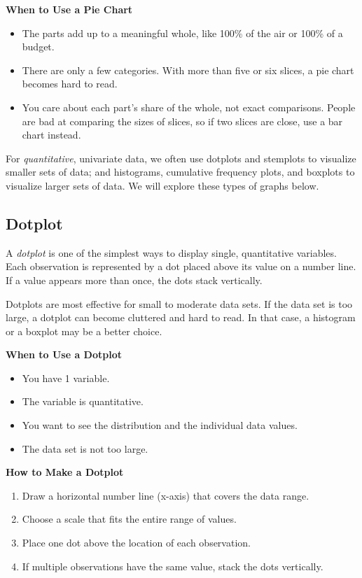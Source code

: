 \textbf{When to Use a Pie Chart}
\begin{itemize}
    \item The parts add up to a meaningful whole, like 100\% of the air or 100\% of a budget.
    \item There are only a few categories. With more than five or six slices, a pie chart becomes hard to read.
    \item You care about each part's share of the whole, not exact comparisons. People are bad at comparing the sizes of slices, so if two slices are close, use a bar chart instead.
\end{itemize}

For \textit{quantitative}, univariate data, we often use dotplots and stemplots to visualize smaller sets of data; and
histograms, cumulative frequency plots, and boxplots to visualize larger sets of data.
We will explore these types of graphs below.

\subsection{Dotplot}

A \textit{dotplot} is one of the simplest ways to display single, quantitative variables.
Each observation is represented by a dot placed above its value on a number line.
If a value appears more than once, the dots stack vertically.

Dotplots are most effective for small to moderate data sets. If the data set is too large,
a dotplot can become cluttered and hard to read. In that case, a histogram or a boxplot may be a better choice.

\textbf{When to Use a Dotplot}
\begin{itemize}
    \item You have 1 variable.
    \item The variable is quantitative.
    \item You want to see the distribution and the individual data values.
    \item The data set is not too large.
\end{itemize}

\textbf{How to Make a Dotplot}
\begin{enumerate}
    \item Draw a horizontal number line (x-axis) that covers the data range.
    \item Choose a scale that fits the entire range of values.
    \item Place one dot above the location of each observation.
    \item If multiple observations have the same value, stack the dots vertically.
\end{enumerate}

